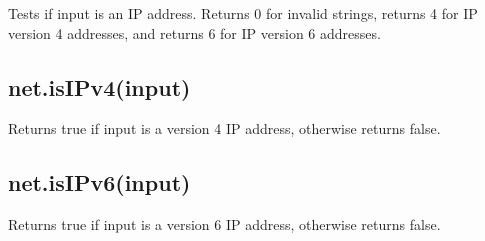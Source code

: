Tests if input is an IP address. Returns 0 for invalid strings, returns
4 for IP version 4 addresses, and returns 6 for IP version 6 addresses.

\subsection{net.isIPv4(input)}\label{net.isipv4input}

Returns true if input is a version 4 IP address, otherwise returns
false.

\subsection{net.isIPv6(input)}\label{net.isipv6input}

Returns true if input is a version 6 IP address, otherwise returns
false.
